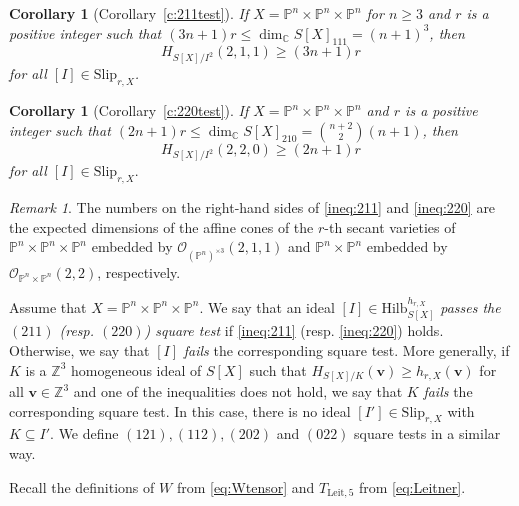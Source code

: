 \documentclass[12pt]{amsart}
\newtheorem{corollary}[theorem]{Corollary}
\theoremstyle{definition}
\theoremstyle{remark}
\newtheorem{remark}[theorem]{Remark}
\theoremstyle{definition}
\newcommand{\vv}{\mathbf{v}}
\newcommand{\HF}[2]{H_{#1}(#2)}
\newcommand{\Slip}[2]{\mathrm{Slip}_{#1,#2}}
\newcommand{\CC}{\mathbb{C}}
\newcommand{\OO}{\mathcal{O}}
\newcommand{\PP}{\mathbb{P}}
\newcommand{\Hilb}{\mathrm{Hilb}}
\begin{document}
\begin{corollary}[Corollary~\ref{c:211test}]\label{c:211testsv}
    If $X=\PP^n\times \PP^n\times\PP^n$ for $n\geq 3$ and $r$ is a positive integer such that $(3n+1)r \leq \dim_\CC S[X]_{111} = (n+1)^3$, then 
    \begin{equation}\label{ineq:211}
    \HF{S[X]/I^2}{2,1,1} \geq  (3n+1)r    
    \end{equation}
	for all $[I]\in \Slip{r}{X}$.
\end{corollary}


\begin{corollary}[Corollary~\ref{c:220test}]\label{c:220testsv}
    If $X=\PP^n\times \PP^n\times \PP^n$ and $r$ is a positive integer such that $(2n+1)r \leq \dim_\CC S[X]_{210} = \binom{n+2}{2}(n+1)$, then 
    \begin{equation}\label{ineq:220}
    \HF{S[X]/I^2}{2,2,0} \geq  (2n+1)r    
    \end{equation}
    for all $[I]\in \Slip{r}{X}.$
\end{corollary}

\begin{remark}
The numbers on the right-hand sides of \eqref{ineq:211} and \eqref{ineq:220} are the expected dimensions of the affine cones of the $r$-th secant varieties of $\PP^n\times \PP^n\times \PP^n$ embedded by $\OO_{(\PP^n)^{\times 3}}(2,1,1)$ and $\PP^n\times \PP^n$ embedded by $\OO_{\PP^n\times \PP^n}(2,2)$, respectively.
\end{remark}


Assume that $X=\PP^n\times \PP^n\times \PP^n$. We say that an ideal $[I]\in \Hilb_{S[X]}^{h_{r,X}}$ \emph{passes the $(211)$ (resp. $(220)$) square test} if \eqref{ineq:211}  (resp. \eqref{ineq:220}) holds. Otherwise, we say that $[I]$ \emph{fails} the corresponding square test. More generally, if $K$ is a $\mathbb{Z}^3$ homogeneous ideal of $S[X]$ such that $\HF{S[X]/K}{\vv} \ge h_{r,X}(\vv)$ for all $\vv\in \mathbb{Z}^3$ and one of the inequalities does not hold, we say that $K$ \emph{fails} the corresponding square test. In this case, there is no ideal $[I']\in \mathrm{Slip}_{r,X}$ with $K \subseteq I'$. We define $(121),(112),(202)$ and $(022)$ square tests in a similar way.

Recall the definitions of $W$ from \eqref{eq:Wtensor} and $T_{\mathrm{Leit},{5}}$ from \eqref{eq:Leitner}.
\end{document}
